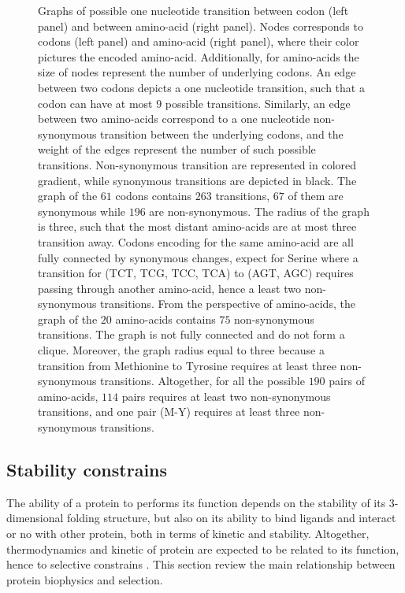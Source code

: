 \begin{figure}[htbp!]
	\caption[Graphs of {codon} and amino-acid transitions]{
		\label{fig:graph-codons-aa}
		Graphs of possible one nucleotide {transition} between \gls{codon} (left panel) and between amino-acid (right panel).
		Nodes corresponds to \glspl{codon} (left panel) and amino-acid (right panel), where their color pictures the encoded amino-acid.
		Additionally, for amino-acids the size of nodes represent the number of underlying \glspl{codon}.
		An edge between two \glspl{codon} depicts a one nucleotide {transition}, such that a \gls{codon} can have at most $9$ possible {transitions}.
		Similarly, an edge between two amino-acids correspond to a one nucleotide non-synonymous {transition} between the underlying \glspl{codon}, and the weight of the edges represent the number of such possible {transitions}.
		Non-synonymous {transition} are represented in colored gradient, while synonymous {transitions} are depicted in black.
		The graph of the $61$ \glspl{codon} contains $263$ {transitions}, $67$ of them are synonymous while $196$ are non-synonymous.
		The radius of the graph is three, such that the most distant amino-acids are at most three {transition} away.
		Codons encoding for the same amino-acid are all fully connected by synonymous changes, expect for Serine where a {transition} for (TCT, TCG, TCC,	TCA) to (AGT, AGC) requires passing through another amino-acid, hence a least two non-synonymous {transitions}.
		From the perspective of amino-acids, the graph of the $20$ amino-acids contains $75$ non-synonymous {transitions}.
		The graph is not fully connected and do not form a clique. Moreover, the graph radius equal to three because a {transition} from Methionine to Tyrosine requires at least three non-synonymous {transitions}.
		Altogether, for all the possible $190$ pairs of amino-acids, $114$ pairs requires at least two non-synonymous {transitions}, and one pair (M-Y) requires at least three non-synonymous {transitions}.
	}
\end{figure}

\subsection{Stability constrains}

The ability of a protein to performs its function depends on the stability of its 3-dimensional folding structure, but also on its ability to bind ligands and interact or no with other protein, both in terms of kinetic and stability.
Altogether, thermodynamics and kinetic of protein are expected to be related to its function, hence to selective constrains \citep{Bastolla2017}.
This section review the main relationship between protein biophysics and selection.


